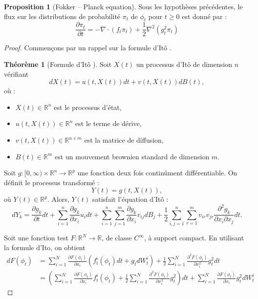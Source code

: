 \documentclass[a4paper,10pt]{article}
\theoremstyle{definition} %
\theoremstyle{definition} %
\newtheorem{proposition}[definition]{Proposition}
\theoremstyle{definition} %
\newtheorem{theorem}[definition]{Théorème}
\theoremstyle{definition} %
\begin{document}
\begin{proposition}[Fokker – Planck equation] 
Sous les hypothèses précédentes, le flux sur les distributions de probabilité $\pi_t$ de $\phi_t$ pour $t \geq 0$ est donné par :
    \begin{equation}
        \frac{\partial\pi_t}{\partial t} = -\nabla \cdot (f_t \pi_t) + \frac{1}{2}\nabla^2(g_t^2\pi_t)
    \end{equation}
\end{proposition}
\begin{proof}
Commençons par un rappel sur la formule d'Itô . 
\begin{theorem}[Formule d'Itô \cite{Oksendal2003}]
Soit \( X(t) \) un processus d’Itô de dimension \( n \) vérifiant  
\[
dX(t) = u(t, X(t)) dt + v(t, X(t)) dB(t),
\]
où :
\begin{itemize}
    \item \( X(t) \in \mathbb{R}^n \) est le processus d’état,
    \item \( u(t, X(t)) \in \mathbb{R}^n \) est le terme de dérive,
    \item \( v(t, X(t)) \in \mathbb{R}^{n \times m} \) est la matrice de diffusion,
    \item \( B(t) \in \mathbb{R}^m \) est un mouvement brownien standard de dimension \( m \).
\end{itemize}

Soit \( g: [0, \infty) \times \mathbb{R}^n \to \mathbb{R}^p \) une fonction deux fois continûment différentiable.  
On définit le processus transformé :
\[
Y(t) = g(t, X(t)),
\]
où \( Y(t) \in \mathbb{R}^p \).  
Alors, \( Y(t) \) satisfait l’équation d’Itô :
\[
dY_k = \frac{\partial g_k}{\partial t} dt 
+ \sum_{i=1}^{n} \frac{\partial g_k}{\partial x_i} u_i dt 
+ \sum_{i=1}^{n} \sum_{j=1}^{m} \frac{\partial g_k}{\partial x_i} v_{ij} dB_j
+ \frac{1}{2} \sum_{i,j=1}^{n} \sum_{r=1}^{m} v_{ir} v_{jr} \frac{\partial^2 g_k}{\partial x_i \partial x_j} dt.
\]
\end{theorem}
\vspace{3em}



Soit une fonction test $F: \mathbb{R}^N \rightarrow \mathbb{R}$, de classe $C^{\infty}$, à support compact. En utilisant la formule d'Ito, on obtient
\begin{align*}
    dF(\phi_t) &= \sum_{i=1}^N \frac{\partial F(\phi_t)}{\partial x_i} (f^i_t(\phi_t)dt + g_tdW^i_t) + \frac{1}{2} \sum_{i=1}^N  \frac{\partial^2 F(\phi_t)}{\partial x_i^2} g_t^2 dt \\
    &= \left(\sum_{i=1}^N \frac{\partial F(\phi_t)}{\partial x_i} f^i_t(\phi_t) + \frac{1}{2} \sum_{i=1}^N  \frac{\partial^2 F(\phi_t)}{\partial x_i^2} g_t^2\right)dt + \sum_{i=1}^N \frac{\partial F(\phi_t)}{\partial x_i}  g_t^2dW^i_t
\end{align*}


\end{proof}
\end{document}

